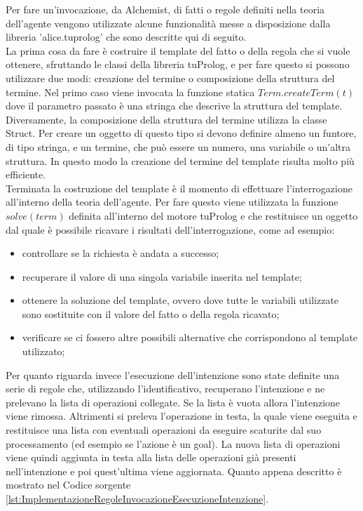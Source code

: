 Per fare un'invocazione, da Alchemist, di fatti o regole definiti nella teoria dell'agente vengono utilizzate alcune funzionalità messe a disposizione dalla libreria 'alice.tuprolog' che sono descritte qui di seguito.
\\
La prima cosa da fare è costruire il template del fatto o della regola che si vuole ottenere, sfruttando le classi della libreria tuProlog, e per fare questo si possono utilizzare due modi: creazione del termine o composizione della struttura del termine. Nel primo caso viene invocata la funzione statica $Term.createTerm(t)$ dove il parametro passato è una stringa che descrive la struttura del template. Diversamente, la composizione della struttura del termine utilizza la classe Struct. Per creare un oggetto di questo tipo si devono definire almeno un funtore, di tipo stringa, e un termine, che può essere un numero, una variabile o un'altra struttura. In questo modo la creazione del termine del template risulta molto più efficiente.
\\
Terminata la costruzione del template è il momento di effettuare l'interrogazione all'interno della teoria dell'agente. Per fare questo viene utilizzata la funzione $solve(term)$ definita all'interno del motore tuProlog e che restituisce un oggetto dal quale è possibile ricavare i risultati dell'interrogazione, come ad esempio:
\begin{itemize}
\item controllare se la richiesta è andata a successo;%
\item recuperare il valore di una singola variabile inserita nel template;%
\item ottenere la soluzione del template, ovvero dove tutte le variabili utilizzate sono sostituite con il valore del fatto o della regola ricavato;%
\item verificare se ci fossero altre possibili alternative che corrispondono al template utilizzato;%
\end{itemize}

Per quanto riguarda invece l'esecuzione dell'intenzione sono state definite una serie di regole che, utilizzando l'identificativo, recuperano l'intenzione e ne prelevano la lista di operazioni collegate. Se la lista è vuota allora l'intenzione viene rimossa. Altrimenti si preleva l'operazione in testa, la quale viene eseguita e restituisce una lista con eventuali operazioni da eseguire scaturite dal suo processamento (ed esempio se l'azione è un goal). La nuova lista di operazioni viene quindi aggiunta in testa alla lista delle operazioni già presenti nell'intenzione e poi quest'ultima viene aggiornata. Quanto appena descritto è mostrato nel Codice sorgente \ref{lst:ImplementazioneRegoleInvocazioneEsecuzioneIntenzione}.

